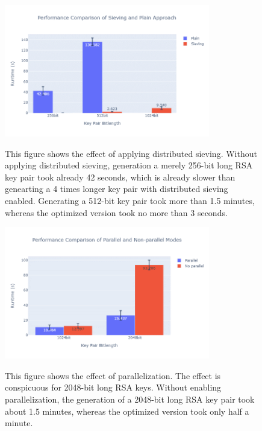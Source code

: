 \begin{figure}[htbp]
  \centering
  \includegraphics[width=0.8\textwidth]{images/comparison_sieving.png}
  \label{fig:sieving}
  \caption{This figure shows the effect of applying distributed sieving. Without applying distributed sieving, generation a merely 256-bit long RSA key pair took already 42 seconds, which is already slower than genearting a 4 times longer key pair with distributed sieving enabled. Generating a 512-bit key pair took more than 1.5 minutes, whereas the optimized version took no more than 3 seconds.}
\end{figure}

\begin{figure}[htbp]
  \centering
  \includegraphics[width=0.8\textwidth]{images/comparison_parallel.png}
  \label{fig:parallel}
  \caption{This figure shows the effect of parallelization. The effect is conspicuous for 2048-bit long RSA keys. Without enabling parallelization, the generation of a 2048-bit long RSA key pair took about 1.5 minutes, whereas the optimized version took only half a minute.}
\end{figure}
